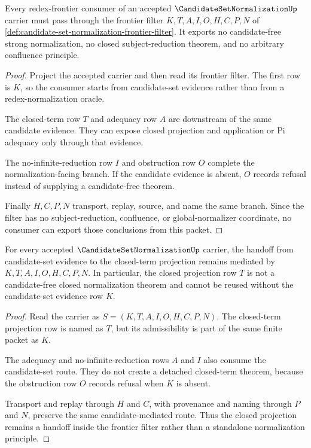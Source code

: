 \begin{theorem}
\label{thm:candidate-set-normalization-redex-nonescape}
Every redex-frontier consumer of an accepted $\CandidateSetNormalizationUp$ carrier must pass through the frontier filter $K,T,A,I,O,H,C,P,N$ of \autoref{def:candidate-set-normalization-frontier-filter}. It exports no candidate-free strong normalization, no closed subject-reduction theorem, and no arbitrary confluence principle.
\end{theorem}
\begin{proof}
Project the accepted carrier and then read its frontier filter. The first row is $K$, so the consumer starts from candidate-set evidence rather than from a redex-normalization oracle.

The closed-term row $T$ and adequacy row $A$ are downstream of the same candidate evidence. They can expose closed projection and application or Pi adequacy only through that evidence.

The no-infinite-reduction row $I$ and obstruction row $O$ complete the normalization-facing branch. If the candidate evidence is absent, $O$ records refusal instead of supplying a candidate-free theorem.

Finally $H,C,P,N$ transport, replay, source, and name the same branch. Since the filter has no subject-reduction, confluence, or global-normalizer coordinate, no consumer can export those conclusions from this packet.
\end{proof}

\begin{theorem}
\label{thm:candidate-set-normalization-candidate-closed-handoff}
For every accepted $\CandidateSetNormalizationUp$ carrier, the handoff from candidate-set evidence to the closed-term projection remains mediated by $K,T,A,I,O,H,C,P,N$. In particular, the closed projection row $T$ is not a candidate-free closed normalization theorem and cannot be reused without the candidate-set evidence row $K$.
\end{theorem}
\begin{proof}
Read the carrier as $S=(K,T,A,I,O,H,C,P,N)$. The closed-term projection row is named as $T$, but its admissibility is part of the same finite packet as $K$.

The adequacy and no-infinite-reduction rows $A$ and $I$ also consume the candidate-set route. They do not create a detached closed-term theorem, because the obstruction row $O$ records refusal when $K$ is absent.

Transport and replay through $H$ and $C$, with provenance and naming through $P$ and $N$, preserve the same candidate-mediated route. Thus the closed projection remains a handoff inside the frontier filter rather than a standalone normalization principle.
\end{proof}

